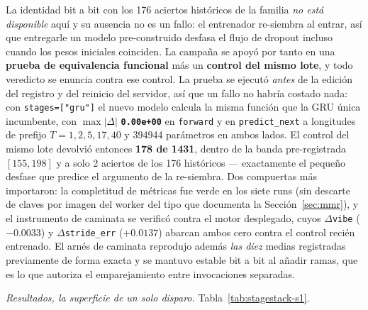 \documentclass[11pt]{article}
\begin{document}
La identidad bit a bit con los \num{176} aciertos históricos de la familia \emph{no
está disponible} aquí y su ausencia no es un fallo: el entrenador re-siembra al
entrar, así que entregarle un modelo pre-construido desfasa el flujo de dropout
incluso cuando los pesos iniciales coinciden. La campaña se apoyó por tanto en una
\textbf{prueba de equivalencia funcional} más un \textbf{control del mismo lote}, y
todo veredicto se enuncia contra ese control. La prueba se ejecutó \emph{antes} de
la edición del registro y del reinicio del servidor, así que un fallo no habría
costado nada: con \texttt{stages=["gru"]} el nuevo modelo calcula la misma función
que la GRU única incumbente, con $\max|\Delta|$ \textbf{\texttt{0.00e+00}} en
\texttt{forward} y en \texttt{predict\_next} a longitudes de prefijo
$T=1,2,5,17,40$ y \num{394944} parámetros en ambos lados. El control del mismo lote
devolvió entonces \textbf{\num{178} de \num{1431}}, dentro de la banda
pre-registrada $[\num{155},\num{198}]$ y a solo \num{2} aciertos de los \num{176}
históricos --- exactamente el pequeño desfase que predice el argumento de la
re-siembra. Dos compuertas más importaron: la completitud de métricas fue verde en
los siete runs (sin descarte de claves por imagen del worker del tipo que documenta
la Sección~\ref{sec:mmr}), y el instrumento de caminata se verificó contra el
motor desplegado, cuyos $\Delta$\texttt{vibe} ($-\num{0.0033}$) y
$\Delta$\texttt{stride\_err} ($+\num{0.0137}$) abarcan ambos cero contra el control
recién entrenado. El arnés de caminata reprodujo además \emph{las diez} medias
registradas previamente de forma exacta y se mantuvo estable bit a bit al añadir
ramas, que es lo que autoriza el emparejamiento entre invocaciones separadas.

\emph{Resultados, la superficie de un solo disparo.} Tabla~\ref{tab:stagestack-s1}.
\end{document}
